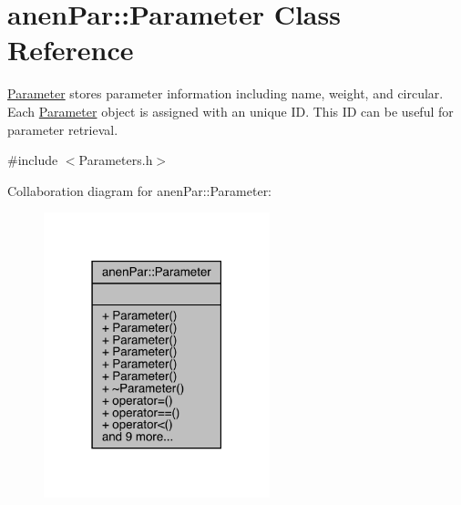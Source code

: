 \hypertarget{classanen_par_1_1_parameter}{}\section{anen\+Par\+:\+:Parameter Class Reference}
\label{classanen_par_1_1_parameter}


\mbox{\hyperlink{classanen_par_1_1_parameter}{Parameter}} stores parameter information including name, weight, and circular. Each \mbox{\hyperlink{classanen_par_1_1_parameter}{Parameter}} object is assigned with an unique ID. This ID can be useful for parameter retrieval.  




{\ttfamily \#include $<$Parameters.\+h$>$}



Collaboration diagram for anen\+Par\+:\+:Parameter\+:\nopagebreak
\begin{figure}[H]
\begin{center}
\leavevmode
\includegraphics[width=186pt]{classanen_par_1_1_parameter__coll__graph}
\end{center}
\end{figure}
